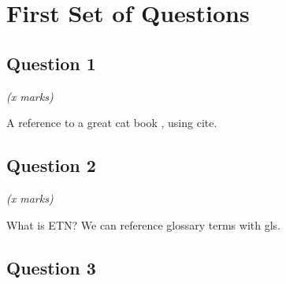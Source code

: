 \documentclass[11pt,fleqn]{book} %
\begin{document}
\pagestyle{empty} %

\tableofcontents %


\pagestyle{fancy} %




\printglossaries




\chapter{First Set of Questions}

\section{Question 1}

\begin{flushright}
    \textit{(x marks)}
\end{flushright}

\vspace{20px}

A reference to a great cat book \cite{hay2010}, using cite.


\section{Question 2}

\begin{flushright}
    \textit{(x marks)}
\end{flushright}

\vspace{20px}

What is \gls{ETN}? We can reference glossary terms with gls.

\section{Question 3}
\end{document}
